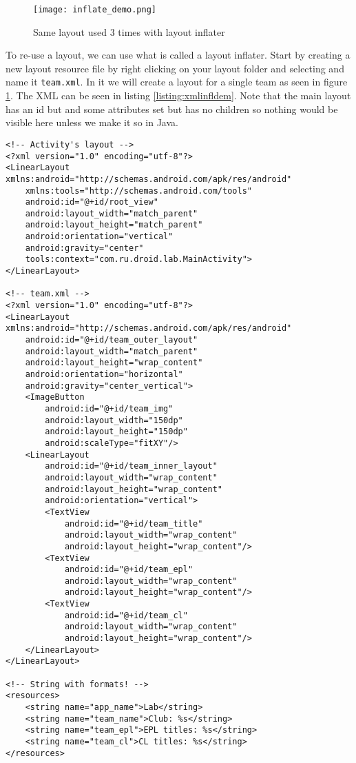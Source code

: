 \begin{figure}[H]
\centering
\texttt{[image: inflate\_demo.png]}
\caption{Same layout used 3 times with layout inflater}
\label{fig:infldem}
\end{figure}

To re-use a layout, we can use what is called a layout inflater. Start by creating a new layout resource file by right clicking on your layout folder and selecting  and name it \texttt{team.xml}. In it we will create a layout for a single team as seen in figure \ref{fig:infldem}. The XML can be seen in listing \ref{listing:xmlinfldem}. Note that the main layout has an id but and some attributes set but has no children so nothing would be visible here unless we make it so in Java.

\begin{lstlisting}[style=A_XML, caption={XML for inflater demo}, label={listing:xmlinfldem}]
<!-- Activity's layout -->
<?xml version="1.0" encoding="utf-8"?>
<LinearLayout xmlns:android="http://schemas.android.com/apk/res/android"
    xmlns:tools="http://schemas.android.com/tools"
    android:id="@+id/root_view"
    android:layout_width="match_parent"
    android:layout_height="match_parent"
    android:orientation="vertical"
    android:gravity="center"
    tools:context="com.ru.droid.lab.MainActivity">
</LinearLayout>

<!-- team.xml -->
<?xml version="1.0" encoding="utf-8"?>
<LinearLayout xmlns:android="http://schemas.android.com/apk/res/android"
    android:id="@+id/team_outer_layout"
    android:layout_width="match_parent"
    android:layout_height="wrap_content"
    android:orientation="horizontal"
    android:gravity="center_vertical">
    <ImageButton
        android:id="@+id/team_img"
        android:layout_width="150dp"
        android:layout_height="150dp"
        android:scaleType="fitXY"/>
    <LinearLayout
        android:id="@+id/team_inner_layout"
        android:layout_width="wrap_content"
        android:layout_height="wrap_content"
        android:orientation="vertical">
        <TextView
            android:id="@+id/team_title"
            android:layout_width="wrap_content"
            android:layout_height="wrap_content"/>
        <TextView
            android:id="@+id/team_epl"
            android:layout_width="wrap_content"
            android:layout_height="wrap_content"/>
        <TextView
            android:id="@+id/team_cl"
            android:layout_width="wrap_content"
            android:layout_height="wrap_content"/>
    </LinearLayout>
</LinearLayout>

<!-- String with formats! -->
<resources>
    <string name="app_name">Lab</string>
    <string name="team_name">Club: %s</string>
    <string name="team_epl">EPL titles: %s</string>
    <string name="team_cl">CL titles: %s</string>
</resources>
\end{lstlisting}

